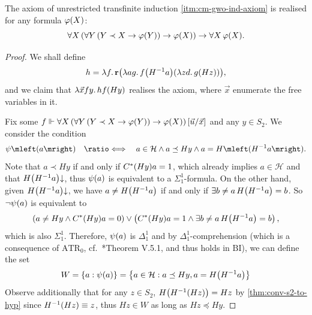 \documentclass[12pt,openany]{book}
\theoremstyle{plain}
\theoremstyle{definition}
\newcommand\opA[1]{\mathop{\forall #1}}
\newcommand\opE[1]{\mathop{\exists #1}}
\newcommand\oplam[1]{\mathop{\lambda #1.}}
\newcommand\defeqv{\quad \ratio\Longleftrightarrow \quad}
\newcommand\ATR{\mathrm{ATR}}
\newcommand\BI{\mathrm{BI}}
\newcommand\br{\mathbf{r}}
\begin{document}
\begin{proposition}[$\BI$]
  \label{prop:cm-gwo-ind-real}
  The axiom of unrestricted transfinite induction \ref{itm:cm-gwo-ind-axiom} is realised for any formula $\varphi\mleft(X\mright)$:
  \[\opA{X} \left(\opA{Y} \left(Y \prec X \rightarrow \varphi\mleft(Y\mright)\right) \rightarrow \varphi\mleft(X\mright)\right) \rightarrow \opA{X} \varphi\mleft(X\mright).\]
\end{proposition}

\begin{proof}
  We shall define
  \[h = \oplam{f} \br \mleft(\oplam{ag} f \mleft(H^{-1} a\mright) \mleft(\oplam{zd} g \mleft(Hz\mright)\mright)\mright),\]
  and we claim that $\oplam{\vec{x} fy} hf \mleft(Hy\mright)$ realises the axiom, where $\vec{x}$ enumerate the free variables in it.

  Fix some $f \Vdash \opA{X} \left(\opA{Y} \left(Y \prec X \rightarrow \varphi\mleft(Y\mright)\right) \rightarrow \varphi\mleft(X\mright)\right)\mleft[\vec{u}/\vec{x}\mright]$ and any $y \in S_2$. We consider the condition
  \[\psi\mleft(a\mright) \defeqv a \in \mathcal{H} \land a \preceq Hy \land a = H \mleft(H^{-1} a\mright).\]
  Note that $a \prec Hy$ if and only if $C^* \mleft(Hy\mright) a = 1$, which already implies $a \in \mathcal{H}$ and that $H \mleft(H^{-1} a\mright) {\downarrow}$, thus $\psi\mleft(a\mright)$ is equivalent to a $\Sigma^1_1$-formula. On the other hand, given $H \mleft(H^{-1} a\mright) {\downarrow}$, we have $a \neq H \mleft(H^{-1} a\mright)$ if and only if $\opE{b \neq a} H \mleft(H^{-1} a\mright) = b$. So $\neg \psi\mleft(a\mright)$ is equivalent to
  \[\left(a \neq Hy \land C^* \mleft(Hy\mright) a = 0\right) \lor \left(C^* \mleft(Hy\mright) a = 1 \land \opE{b \neq a} H \mleft(H^{-1} a\mright) = b\right),\]
  which is also $\Sigma^1_1$. Therefore, $\psi\mleft(a\mright)$ is $\Delta^1_1$ and by $\Delta^1_1$-comprehension (which is a consequence of $\ATR_0$, cf.\ \cite{simpson09-soa}*{Theorem V.5.1}, and thus holds in $\BI$), we can define the set
  \[W = \left\{a : \psi\mleft(a\mright)\right\} = \left\{a \in \mathcal{H} : a \preceq Hy, a = H \mleft(H^{-1} a\mright)\right\}\]
  Observe additionally that for any $z \in S_2$, $H \mleft(H^{-1} \mleft(Hz\mright)\mright) = Hz$ by \autoref{thm:conv-s2-to-hyp} since $H^{-1} \mleft(Hz\mright) \equiv z$, thus $Hz \in W$ as long as $Hz \preceq Hy$.


\end{proof}
\end{document}

